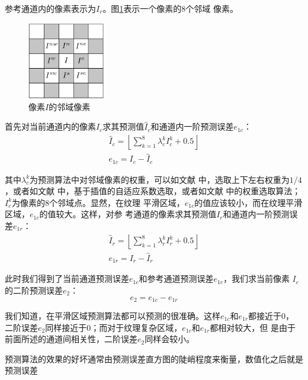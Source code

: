 参考通道内的像素表示为$I_r$。图\ref{fig:pixel_neighbour2}表示一个像素的8个邻域
像素。
\begin{figure}
  \centering
  \includegraphics[width=0.3\textwidth]{figures/pixel_neighbourhood.eps}
  \caption{像素$I$的邻域像素}
  \label{fig:pixel_neighbour2}
\end{figure}
\par
首先对当前通道内的像素$I_c$求其预测值$\hat{I}_c$和通道内一阶预测误差$e_{1c}$：
\begin{eqnarray}
  & \displaystyle \hat{I}_c=
    \left\lfloor \sum_{k=1}^8\lambda_c^kI_c^k+0.5 \right\rfloor & \\
  & e_{1c}=I_c-\hat{I}_c &
  \label{eq:current_predict}
\end{eqnarray}
\par
其中$\lambda_c^k$为预测算法中对邻域像素的权重，可以如文献
\cite{sachnev2009reversible}中，选取上下左右权重为$1/4$，或者如文献
\cite{luo2010reversible}中，基于插值的自适应系数选取，或者如文献
\cite{li2013reversible}中的权重选取算法；$I_c^k$为像素的8个邻域点。显然，在纹理
平滑区域，$e_{1c}$的值应该较小，而在纹理平滑区域，$e_{1c}$的值较大。这样，对参
考通道的像素求其预测值$I_r$和通道内一阶预测误差$e_{1r}$：
\begin{eqnarray}
  & \displaystyle \hat{I}_r=
    \left\lfloor \sum_{k=1}^8\lambda_r^kI_r^k+0.5 \right\rfloor & \\
  & e_{1r}=I_r-\hat{I}_r &
  \label{eq:reference_predict}
\end{eqnarray}
\par
此时我们得到了当前通道预测误差$e_{1c}$和参考通道预测误差$e_{1c}$，我们求当前像素
$I_c$的二阶预测误差$e_2$：
\begin{equation}
  e_2=e_{1c}-e_{1r}
  \label{eq:second_predict}
\end{equation}
\par
我们知道，在平滑区域预测算法都可以预测的很准确。这样$e_{1c}$和$e_{1r}$都接近于0，
二阶误差$e_2$同样接近于0；而对于纹理复杂区域，$e_{1c}$和$e_{1r}$都相对较大，但
是由于前面所述的通道间相关性，二阶误差$e_2$同样会较小。
\par
预测算法的效果的好坏通常由预测误差直方图的陡峭程度来衡量，数值化之后就是预测误差
